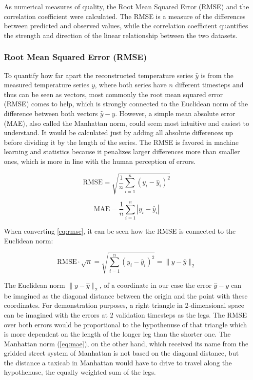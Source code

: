 As numerical measures of quality, the Root Mean Squared Error (RMSE) and the correlation coefficient were calculated. The RMSE is a measure of the differences between predicted and observed values, while the correlation coefficient quantifies the strength and direction of the linear relationship between the two datasets. 


\subsubsection*{Root Mean Squared Error (RMSE)}

To quantify how far apart the reconstructed temperature series $\hat{y}$ is from the measured temperature series $y$, where both series have $n$ different timesteps and thus can be seen as vectors, most commonly the root mean squared error (RMSE) comes to help, which is strongly connected to the Euclidean norm of the difference between both vectors $\hat{y} - y$. However, a simple mean absolute error (MAE), also called the Manhattan norm, could seem most intuitive and easiest to understand. It would be calculated just by adding all absolute differences up before dividing it by the length of the series. The RMSE is favored in machine learning and statistics because it penalizes larger differences more than smaller ones, which is more in line with the human perception of errors. 

\begin{equation}
    \text{RMSE} = \sqrt{\frac{1}{n} \sum_{i=1}^{n} (y_i - \hat{y}_i)^2}
    \label{eq:rmse}
\end{equation}

\begin{equation}
    \text{MAE} = \frac{1}{n} \sum_{i=1}^{n} |y_i - \hat{y}_i|
    \label{eq:mae}
\end{equation}

When converting \autoref*{eq:rmse}, it can be seen how the RMSE is connected to the Euclidean norm:

\begin{equation}
  \text{RMSE} \cdot \sqrt{n} = \sqrt{\sum_{i=1}^{n} (y_i - \hat{y}_i)^2} = \| y - \hat{y} \|_2  
  \label{eq:rmse_euclid}
\end{equation}

The Euclidean norm $\| y - \hat{y} \|_2$, of a coordinate in our case the error $\hat{y} - y$ can be imagined as the diagonal distance between the origin and the point with these coordinates. For demonstration purposes, a right triangle in 2-dimensional space can be imagined with the errors at 2 validation timesteps as the legs. The RMSE over both errors would be proportional to the hypothenuse of that triangle which is more dependent on the length of the longer leg than the shorter one. The Manhattan norm (\autoref{eq:mae}), on the other hand, which received its name from the gridded street system of Manhattan is not based on the diagonal distance, but the distance a taxicab in Manhattan would have to drive to travel along the hypothenuse, the equally weighted sum of the legs.

